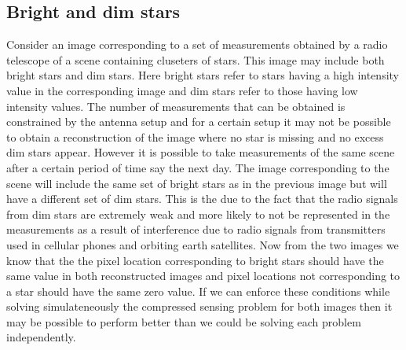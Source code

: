 \subsection{Bright and dim stars}
Consider an image corresponding to a set of measurements obtained by a radio telescope of a scene containing cluseters of stars.
This image may include both bright stars and dim stars. Here bright stars refer to stars having a high intensity value in the corresponding image and dim stars refer to those having low intensity values. The number of measurements that can be obtained is constrained by the antenna setup and for a certain setup it may not be possible to obtain a reconstruction of the image where no star is missing and no excess dim stars appear. However it is possible to take measurements of the same scene after a certain period of time say the next day. The image corresponding to the scene will include the same set of bright stars as in the previous image but will have a different set of dim stars. This is the due to the fact that the radio signals from dim stars are extremely weak and more likely to not be represented in the measurements as a result of interference due to radio signals from transmitters used in cellular phones and orbiting earth satellites. Now from the two images we know that the the pixel location corresponding to bright stars should have the same value in both reconstructed images and pixel locations not corresponding to a star should have the same zero value. If we can enforce these conditions while solving simulateneously the compressed sensing problem for both images then it may be possible to perform better than we could be solving each problem independently.
